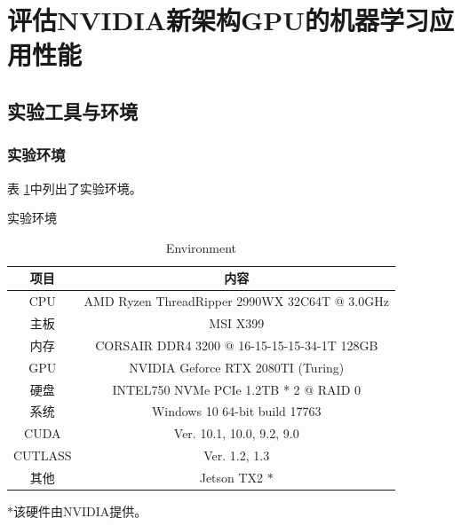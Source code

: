 \newpage
\section{评估NVIDIA新架构GPU的机器学习应用性能}
\setcounter{table}{0}
\setcounter{figure}{0}
\subsection{实验工具与环境}
\subsubsection{实验环境}
\par 表 \ref{table-环境}中列出了实验环境。\\
\begin{table}
	\centering
	\renewcommand{\thetable}{\arabic{section}-\arabic{table} }
	\renewcommand{\tablename}{表}
	\caption{实验环境}
	\addtocounter{table}{-1}
	\renewcommand{\thetable}{\arabic{section}-\arabic{table} }
	\renewcommand{\tablename}{Table}
	\caption{Environment}
	\begin{tabular}{cc}
		\toprule
		项目	&	内容\\
		\midrule
		CPU		&	AMD Ryzen ThreadRipper 2990WX 32C64T @ 3.0GHz\\
		主板		&	MSI X399\\
		内存		&	CORSAIR DDR4 3200 @ 16-15-15-15-34-1T 128GB\\
		GPU		&	NVIDIA Geforce RTX 2080TI (Turing)\\
		硬盘		&	INTEL750 NVMe PCIe 1.2TB * 2 @ RAID 0\\
		系统		&	Windows 10 64-bit build 17763\\	
		CUDA	&	Ver. 10.1, 10.0, 9.2, 9.0\\
		CUTLASS & Ver. 1.2, 1.3\\
		其他		&	Jetson TX2 $ * $\\
		\bottomrule
	\end{tabular} 
	\label{table-环境}
	
	$ * $该硬件由NVIDIA提供。\\
\end{table}


